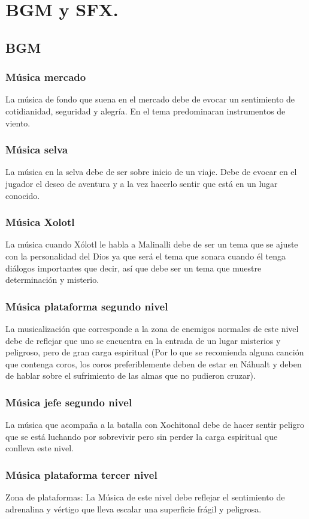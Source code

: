 \chapter{BGM y SFX.}
\section{BGM}
\subsection{Música  mercado}\label{Musica:N01_ZN01}
La música de fondo que suena en el mercado debe de evocar un sentimiento de cotidianidad, seguridad y alegría. En el tema predominaran instrumentos de viento. 		
\subsection{Música  selva}\label{Musica:N01_ZN02}
La música en la selva debe de ser sobre inicio de un viaje. Debe de evocar en el jugador el deseo de aventura y a la vez hacerlo sentir que está en un lugar conocido.
\subsection{Música  Xolotl} \label{Musica:Xolotl}
La música cuando Xólotl le habla a Malinalli debe de ser un tema que se ajuste con la personalidad del Dios ya que será el tema que sonara cuando él tenga diálogos importantes que decir, así que debe ser un tema que muestre determinación y misterio.
\subsection{Música plataforma segundo nivel}\label{Musica:N02_ZN01}
La musicalización que corresponde a la zona de enemigos normales de este nivel debe de reflejar que uno se encuentra en la entrada de un lugar misterios y peligroso, pero de gran carga espiritual (Por lo que se recomienda alguna canción que contenga coros, los coros preferiblemente deben de estar en Náhualt y deben de hablar sobre el sufrimiento de las almas que no pudieron cruzar).
\subsection{Música jefe segundo nivel}\label{Musica:N02_ZN02}
La música que acompaña a la batalla con Xochitonal debe de hacer sentir peligro que se está luchando por sobrevivir pero sin perder la carga espiritual que conlleva este nivel. 
\subsection{Música plataforma tercer nivel} \label{Musica:N03_ZN01}
Zona de plataformas: La Música  de este nivel debe reflejar el sentimiento de adrenalina y vértigo que lleva escalar una superficie frágil y peligrosa.
